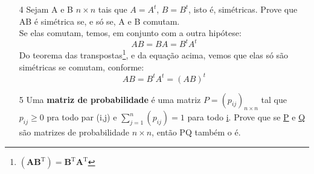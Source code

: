 \documentclass[a4paper]{article}
\begin{document}
\begin{itemize}

\item[4] Sejam A e B $n\times n$ tais que $A=A^t$, $B=B^t$, isto é, simétricas. Prove que AB é simétrica se, e só se, A e B comutam.
\textcolor[rgb]{0,0,1}{\\Se elas comutam, temos, em conjunto com a outra hipótese:
$$AB=BA=B^tA^t$$
Do teorema das transpostas\footnote{$(\mathbf{A B}^\mathrm{T}) = \mathbf{B}^\mathrm{T} \mathbf{A}^\mathrm{T}$}, e da equação acima, vemos que elas só são simétricas se comutam, conforme:
$$AB=B^tA^t=(AB)^t$$}

\item[5] Uma \textbf{matriz de probabilidade} é uma matriz $P=(p_{ij})_{n \times n}$ tal que $p_{ij} \geq 0$ pra todo par (i,j) e $\sum\limits_{j=1}^{n}(p_{ij})=1$ para todo \underline{i}. Prove que se \underline{P} e \underline{Q} são matrizes de probabilidade $n \times n$, então PQ também o é.


\end{itemize}
\end{document}
